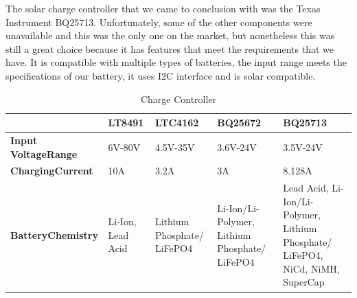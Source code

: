 The solar charge controller that we came to conclusion with was the Texas Instrument BQ25713. Unfortunately, some of the other components were unavailable and this was the only one on the market, but nonetheless this was still a great choice because it has features that meet the requirements that we have. It is compatible with multiple types of batteries, the input range meets the specifications of our battery, it uses I2C interface and is solar compatible.\par
\begin{table}[H]
    \centering
	\begin{tabularx}{\textwidth}
			{
			| >{\raggedright\arraybackslash}X
			| >{\raggedright\arraybackslash}X
			| >{\raggedright\arraybackslash}X
			| >{\raggedright\arraybackslash}X
			| >{\raggedright\arraybackslash}X
			|
		}
		\caption{Charge Controller}
		\label{table:chargecontroller} \\
		\hline
		 & \textbf{LT8491} & \textbf{LTC4162} & \textbf{BQ25672} &  \textbf{BQ25713} \\
		\hline
		\textbf{Input Voltage\-Range} & 6V-80V & 4.5V-35V & 3.6V-24V & 3.5V-24V \\
		\hline
		\textbf{Charging\-Current} & 10A & 3.2A & 3A & 8.128A \\
		\hline
		\textbf{Battery\-Chemistry} & Li-Ion, Lead Acid & Lithium Phosphate/ LiFePO4 & Li-Ion/Li-Polymer, Lithium Phosphate/ LiFePO4 & Lead Acid, Li-Ion/Li-Polymer, Lithium Phosphate/ LiFePO4, NiCd, NiMH, SuperCap \\
		\hline
	\end{tabularx}
\end{table}
